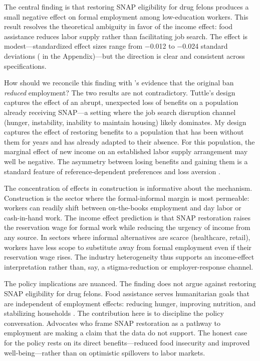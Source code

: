 \documentclass[12pt]{article}
\begin{document}
The central finding is that restoring SNAP eligibility for drug felons produces a small negative effect on formal employment among low-education workers. This result resolves the theoretical ambiguity in favor of the income effect: food assistance reduces labor supply rather than facilitating job search. The effect is modest---standardized effect sizes range from $-$0.012 to $-$0.024 standard deviations ( in the Appendix)---but the direction is clear and consistent across specifications.

How should we reconcile this finding with \citet{tuttle2019snap}'s evidence that the original ban \textit{reduced} employment? The two results are not contradictory. Tuttle's design captures the effect of an abrupt, unexpected loss of benefits on a population already receiving SNAP---a setting where the job search disruption channel (hunger, instability, inability to maintain housing) likely dominates. My design captures the effect of restoring benefits to a population that has been without them for years and has already adapted to their absence. For this population, the marginal effect of new income on an established labor supply arrangement may well be negative. The asymmetry between losing benefits and gaining them is a standard feature of reference-dependent preferences and loss aversion \citep{kahneman1979prospect}.

The concentration of effects in construction is informative about the mechanism. Construction is the sector where the formal-informal margin is most permeable: workers can readily shift between on-the-books employment and day labor or cash-in-hand work. The income effect prediction is that SNAP restoration raises the reservation wage for formal work while reducing the urgency of income from any source. In sectors where informal alternatives are scarce (healthcare, retail), workers have less scope to substitute away from formal employment even if their reservation wage rises. The industry heterogeneity thus supports an income-effect interpretation rather than, say, a stigma-reduction or employer-response channel.

The policy implications are nuanced. The finding does not argue against restoring SNAP eligibility for drug felons. Food assistance serves humanitarian goals that are independent of employment effects: reducing hunger, improving nutrition, and stabilizing households \citep{hoynes2012snap, homonoff2021does}. The contribution here is to discipline the policy conversation. Advocates who frame SNAP restoration as a pathway to employment are making a claim that the data do not support. The honest case for the policy rests on its direct benefits---reduced food insecurity and improved well-being---rather than on optimistic spillovers to labor markets.
\end{document}
